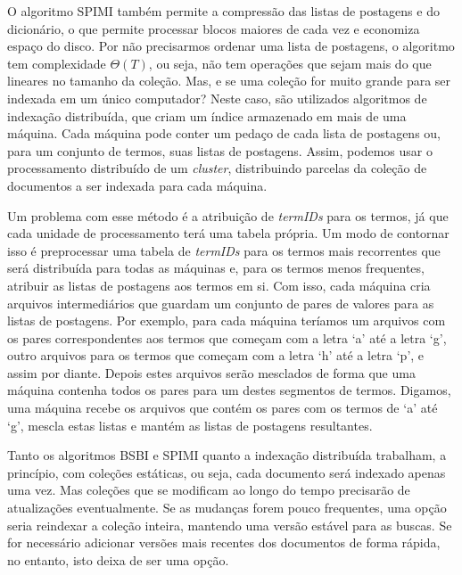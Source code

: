 O algoritmo SPIMI também permite a compressão das listas de postagens e do dicionário, o que permite processar blocos maiores de cada vez e economiza espaço do disco. Por não precisarmos ordenar uma lista de postagens, o algoritmo tem complexidade $\Theta( T )$, ou seja, não tem operações que sejam mais do que lineares no tamanho da coleção.
Mas, e se uma coleção for muito grande para ser indexada em um único computador? Neste caso, são utilizados algoritmos de indexação distribuída, que criam um índice armazenado em mais de uma máquina. Cada máquina pode conter um pedaço de cada lista de postagens ou, para um conjunto de termos, suas listas de postagens. Assim, podemos usar o processamento distribuído de um \emph{cluster}, distribuindo parcelas da coleção de documentos a ser indexada para cada máquina.

Um problema com esse método é a atribuição de \emph{termIDs} para os termos, já que cada unidade de processamento terá uma tabela própria. Um modo de contornar isso é preprocessar uma tabela de \emph{termIDs} para os termos mais recorrentes que será distribuída para todas as máquinas e, para os termos menos frequentes, atribuir as listas de postagens aos termos em si. Com isso, cada máquina cria arquivos intermediários que guardam um conjunto de pares de valores para as listas de postagens. Por exemplo, para cada máquina teríamos um arquivos com os pares correspondentes aos termos que começam com a letra `a' até a letra `g', outro arquivos para os termos que começam com a letra `h' até a letra `p', e assim por diante. Depois estes arquivos serão mesclados de forma que uma máquina contenha todos os pares para um destes segmentos de termos. Digamos, uma máquina recebe os arquivos que contém os pares com os termos de `a' até `g', mescla estas listas e mantém as listas de postagens resultantes.

Tanto os algoritmos BSBI e SPIMI quanto a indexação distribuída trabalham, a princípio, com coleções estáticas, ou seja, cada documento será indexado apenas uma vez. Mas coleções que se modificam ao longo do tempo precisarão de atualizações eventualmente. Se as mudanças forem pouco frequentes, uma opção seria reindexar a coleção inteira, mantendo uma versão estável para as buscas. Se for necessário adicionar versões mais recentes dos documentos de forma rápida, no entanto, isto deixa de ser uma opção. 

